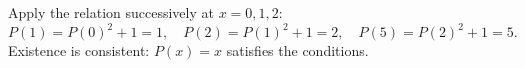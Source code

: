 Apply the relation successively at $x=0,1,2$:
\[
P(1)=P(0)^2+1=1,\quad
P(2)=P(1)^2+1=2,\quad
P(5)=P(2)^2+1=\boxed5.
\]
Existence is consistent: $P(x)=x$ satisfies the conditions.
